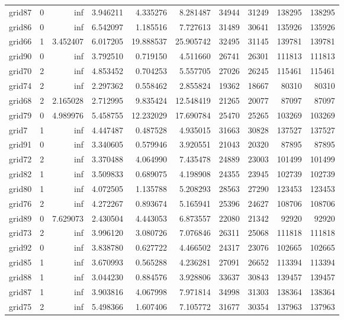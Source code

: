 \begin{longtable}{|l|r|r|r|r|r|r|r|r|r|}
grid87 & 0 & inf & 3.946211 & 4.335276 & 8.281487 & 34944 & 31249 & 138295 & 138295 \\
grid86 & 0 & inf & 6.542097 & 1.185516 & 7.727613 & 31489 & 30641 & 135926 & 135926 \\
grid66 & 1 & 3.452407 & 6.017205 & 19.888537 & 25.905742 & 32495 & 31145 & 139781 & 139781 \\
grid90 & 0 & inf & 3.792510 & 0.719150 & 4.511660 & 26741 & 26301 & 111813 & 111813 \\
grid70 & 2 & inf & 4.853452 & 0.704253 & 5.557705 & 27026 & 26245 & 115461 & 115461 \\
grid74 & 2 & inf & 2.297362 & 0.558462 & 2.855824 & 19362 & 18667 & 80310 & 80310 \\
grid68 & 2 & 2.165028 & 2.712995 & 9.835424 & 12.548419 & 21265 & 20077 & 87097 & 87097 \\
grid79 & 0 & 4.989976 & 5.458755 & 12.232029 & 17.690784 & 25470 & 25265 & 103269 & 103269 \\
grid7 & 1 & inf & 4.447487 & 0.487528 & 4.935015 & 31663 & 30828 & 137527 & 137527 \\
grid91 & 0 & inf & 3.340605 & 0.579946 & 3.920551 & 21043 & 20320 & 87895 & 87895 \\
grid72 & 2 & inf & 3.370488 & 4.064990 & 7.435478 & 24889 & 23003 & 101499 & 101499 \\
grid82 & 1 & inf & 3.509833 & 0.689075 & 4.198908 & 24355 & 23945 & 102739 & 102739 \\
grid80 & 1 & inf & 4.072505 & 1.135788 & 5.208293 & 28563 & 27290 & 123453 & 123453 \\
grid76 & 2 & inf & 4.272267 & 0.893674 & 5.165941 & 25396 & 24627 & 108706 & 108706 \\
grid89 & 0 & 7.629073 & 2.430504 & 4.443053 & 6.873557 & 22080 & 21342 & 92920 & 92920 \\
grid73 & 2 & inf & 3.996120 & 3.080726 & 7.076846 & 26311 & 25068 & 111818 & 111818 \\
grid92 & 0 & inf & 3.838780 & 0.627722 & 4.466502 & 24317 & 23076 & 102665 & 102665 \\
grid85 & 1 & inf & 3.670993 & 0.565288 & 4.236281 & 27091 & 26652 & 113394 & 113394 \\
grid88 & 1 & inf & 3.044230 & 0.884576 & 3.928806 & 33637 & 30843 & 139457 & 139457 \\
grid87 & 1 & inf & 3.903816 & 4.067998 & 7.971814 & 34998 & 31303 & 138364 & 138364 \\
grid75 & 2 & inf & 5.498366 & 1.607406 & 7.105772 & 31677 & 30354 & 137963 & 137963 \\

\end{longtable}
